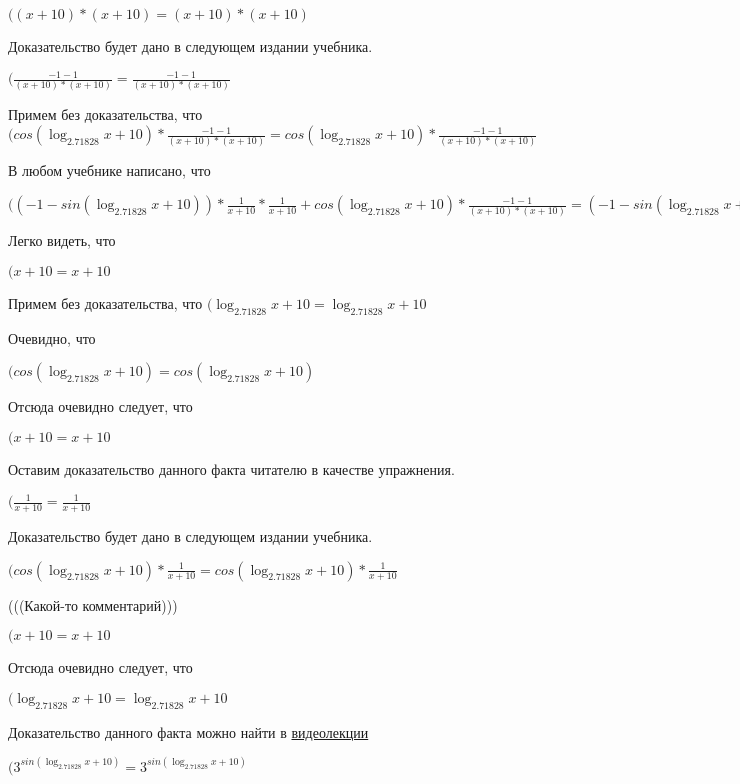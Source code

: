\documentclass[12pt,a4paper,fleqn]{article}
\theoremstyle{definition}
\begin{document}
$(( x  +  10 ) * ( x  +  10 ) = ( x  +  10 ) * ( x  +  10 )$

Доказательство будет дано в следующем издании учебника.

$(\frac{ -1  -  1 }{( x  +  10 ) * ( x  +  10 )}
 = \frac{ -1  -  1 }{( x  +  10 ) * ( x  +  10 )}
$

Примем без доказательства, что
$(cos(\log_{ 2.71828 }{ x  +  10 }) * \frac{ -1  -  1 }{( x  +  10 ) * ( x  +  10 )}
 = cos(\log_{ 2.71828 }{ x  +  10 }) * \frac{ -1  -  1 }{( x  +  10 ) * ( x  +  10 )}
$

В любом учебнике написано, что

$(( -1  - sin(\log_{ 2.71828 }{ x  +  10 })) * \frac{ 1 }{ x  +  10 }
 * \frac{ 1 }{ x  +  10 }
 + cos(\log_{ 2.71828 }{ x  +  10 }) * \frac{ -1  -  1 }{( x  +  10 ) * ( x  +  10 )}
 = ( -1  - sin(\log_{ 2.71828 }{ x  +  10 })) * \frac{ 1 }{ x  +  10 }
 * \frac{ 1 }{ x  +  10 }
 + cos(\log_{ 2.71828 }{ x  +  10 }) * \frac{ -1  -  1 }{( x  +  10 ) * ( x  +  10 )}
$

Легко видеть, что

$( x  +  10  =  x  +  10 $

Примем без доказательства, что
$(\log_{ 2.71828 }{ x  +  10 } = \log_{ 2.71828 }{ x  +  10 }$

Очевидно, что

$(cos(\log_{ 2.71828 }{ x  +  10 }) = cos(\log_{ 2.71828 }{ x  +  10 })$

Отсюда очевидно следует, что

$( x  +  10  =  x  +  10 $

Оставим доказательство данного факта читателю в качестве упражнения.

$(\frac{ 1 }{ x  +  10 }
 = \frac{ 1 }{ x  +  10 }
$

Доказательство будет дано в следующем издании учебника.

$(cos(\log_{ 2.71828 }{ x  +  10 }) * \frac{ 1 }{ x  +  10 }
 = cos(\log_{ 2.71828 }{ x  +  10 }) * \frac{ 1 }{ x  +  10 }
$

(((Какой-то комментарий)))

$( x  +  10  =  x  +  10 $

Отсюда очевидно следует, что

$(\log_{ 2.71828 }{ x  +  10 } = \log_{ 2.71828 }{ x  +  10 }$

Доказательство данного факта можно найти в \href{https://www.youtube.com/watch?v=dQw4w9WgXcQ}{видеолекции}

$({ 3 }^{sin(\log_{ 2.71828 }{ x  +  10 })} = { 3 }^{sin(\log_{ 2.71828 }{ x  +  10 })}$
\end{document}
